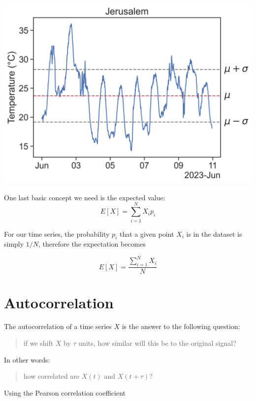 \documentclass[
  letterpaper,
  DIV=11,
  numbers=noendperiod,
  oneside]{scrreprt}
\begin{document}
\includegraphics{stationarity/jer_temp2.png}

One last basic concept we need is the expected value: \[
E[X] = \sum_{i=1}^N X_i p_i
\]

For our time series, the probability \(p_i\) that a given point \(X_i\)
is in the dataset is simply \(1/N\), therefore the expectation becomes

\[
E[X] = \frac{\displaystyle\sum_{i=1}^N X_i}{N}
\]

\hypertarget{autocorrelation-1}{%
\section{Autocorrelation}\label{autocorrelation-1}}

The autocorrelation of a time series \(X\) is the answer to the
following question:

\begin{quote}
if we shift \(X\) by \(\tau\) units, how similar will this be to the
original signal?
\end{quote}

In other words:

\begin{quote}
how correlated are \(X(t)\) and \(X(t+\tau)\)?
\end{quote}

Using the Pearson correlation coefficient

\end{document}

